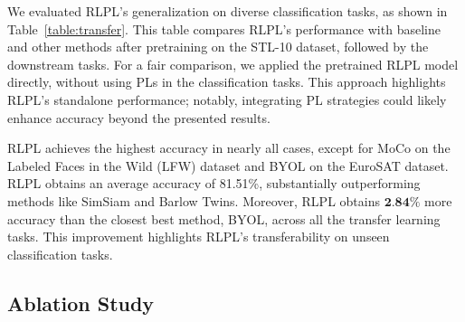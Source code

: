\begin{table}[htbp]
    \centering
    \caption{Performance comparison (\% test accuracy) of methods on various datasets.}
    \label{table:transfer}
\end{table}

We evaluated RLPL's generalization on diverse classification tasks, as shown in Table~\ref{table:transfer}. This table compares RLPL's performance with baseline and other methods after pretraining on the STL-10 dataset, followed by the downstream tasks. For a fair comparison, we applied the pretrained RLPL model directly, without using PLs in the classification tasks. This approach highlights RLPL's standalone performance; notably, integrating PL strategies could likely enhance accuracy beyond the presented results.

RLPL achieves the highest accuracy in nearly all cases, except for MoCo on the Labeled Faces in the Wild (LFW) dataset and BYOL on the EuroSAT dataset. RLPL obtains an average accuracy of 81.51\%, substantially outperforming methods like SimSiam and Barlow Twins. Moreover, RLPL obtains $\textbf{2.84\%}$ more accuracy than the closest best method, BYOL, across all the transfer learning tasks. This improvement highlights RLPL's transferability on unseen classification tasks.

\subsection{Ablation Study}

